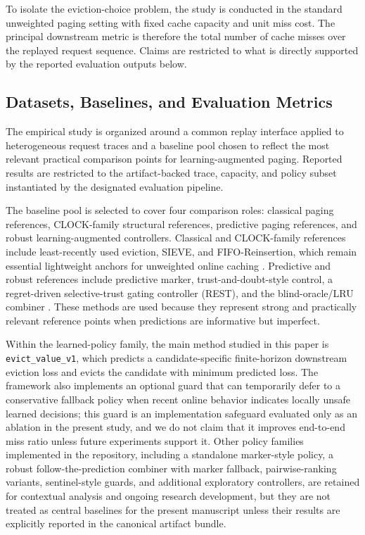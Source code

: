 \documentclass[preprint,12pt]{elsarticle}
\begin{document}
To isolate the eviction-choice problem, the study is conducted in the standard unweighted paging setting with fixed cache capacity and unit miss cost. The principal downstream metric is therefore the total number of cache misses over the replayed request sequence. Claims are restricted to what is directly supported by the reported evaluation outputs below.

\subsection{Datasets, Baselines, and Evaluation Metrics}
\label{subsec:datasets-baselines-metrics}

The empirical study is organized around a common replay interface applied to heterogeneous request traces and a baseline pool chosen to reflect the most relevant practical comparison points for learning-augmented paging. Reported results are restricted to the artifact-backed trace, capacity, and policy subset instantiated by the designated evaluation pipeline.

The baseline pool is selected to cover four comparison roles: classical paging references, CLOCK-family structural references, predictive paging references, and robust learning-augmented controllers. Classical and CLOCK-family references include least-recently used eviction, SIEVE, and FIFO-Reinsertion, which remain essential lightweight anchors for unweighted online caching \cite{belady1966replacement_algorithms,fiat1991competitive_paging,zhang2024sieve}. Predictive and robust references include predictive marker, trust-and-doubt-style control, a regret-driven selective-trust gating controller (REST), and the blind-oracle/LRU combiner \cite{lykouris2021competitive_caching,antoniadis2020online_metric_untrusted,wei2020better_simpler_lac,chledowski2021robust_lac_experimental,im2022parsimonious_lac,rohatgi2020near_optimal_caching}. These methods are used because they represent strong and practically relevant reference points when predictions are informative but imperfect.

Within the learned-policy family, the main method studied in this paper is \texttt{evict\_value\_v1}, which predicts a candidate-specific finite-horizon downstream eviction loss and evicts the candidate with minimum predicted loss. The framework also implements an optional guard that can temporarily defer to a conservative fallback policy when recent online behavior indicates locally unsafe learned decisions; this guard is an implementation safeguard evaluated only as an ablation in the present study, and we do not claim that it improves end-to-end miss ratio unless future experiments support it. Other policy families implemented in the repository, including a standalone marker-style policy, a robust follow-the-prediction combiner with marker fallback, pairwise-ranking variants, sentinel-style guards, and additional exploratory controllers, are retained for contextual analysis and ongoing research development, but they are not treated as central baselines for the present manuscript unless their results are explicitly reported in the canonical artifact bundle.
\end{document}
